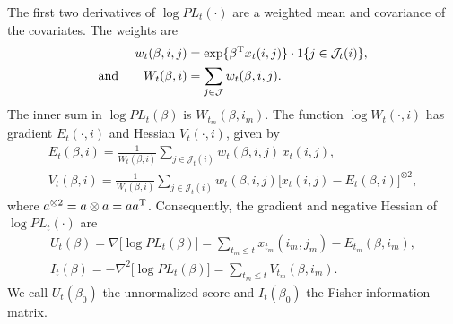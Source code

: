 \documentclass[aoas,preprint]{imsart}
\begin{document}
The first two derivatives of $\log \mathit{PL}_t(\cdot)$ are a weighted
mean and covariance of the covariates.  The weights are
\begin{subequations}
\begin{align}
    w_{t}(\beta, i,j)
        &=
        \exp\{ \beta^\trans x_t(i,j) \}
        \cdot
        1\{ j \in \mathcal{J}_t(i)\}, \\
    \text{and}\qquad
    W_{t}(\beta, i)
        &=
        \sum_{j \in \mathcal{J}} w_{t}(\beta, i,j).
\end{align}
\end{subequations}
The inner sum in $\log \mathit{PL}_t(\beta)$ is
$W_{t_m}\!(\beta, i_m)$.  The function 
$\log W_{t}(\cdot, i)$ has gradient $E_{t}(\cdot, i)$ and Hessian 
$V_{t}(\cdot, i)$, given by
\begin{subequations}
\begin{gather}
    E_{t}(\beta, i)
        =
        \frac{1}{W_{t}(\beta, i)}
        \sum_{j \in \mathcal{J}_t(i)}
            w_{t}(\beta, i,j) \, x_{t}(i,j), \\
    V_{t}(\beta, i)
        =
        \frac{1}{W_{t}(\beta, i)}
        \sum_{j \in \mathcal{J}_t(i)}
            w_{t}(\beta, i,j) 
            \Big[ x_{t}(i,j) - E_{t}(\beta, i)\Big]^{\otimes 2},
\end{gather}
\end{subequations}
where $a^{\otimes 2} = a \otimes a = a a^{\mathrm{T}}$.
Consequently, the gradient and negative Hessian of
$\log \mathit{PL}_t(\cdot)$ are
\begin{subequations}
\begin{gather}
    \label{E:log-pl-gradient}
    U_t(\beta)
        =
        \nabla \big[ \log \mathit{PL}_t(\beta) \big]
        =
        \sum_{t_m \leq t}
            x_{t_m}(i_m, j_m) - E_{t_m}(\beta, i_m), \\
    \label{E:log-pl-neg-hessian}            
    I_t(\beta)
        =
        -\nabla^2 \big[ \log \mathit{PL}_t(\beta) \big]
        =
        \sum_{t_m \leq t}
            V_{t_m}(\beta, i_m).
\end{gather}
\end{subequations}
We call $U_t(\beta_0)$ the unnormalized score and $I_t(\beta_0)$
the Fisher information matrix.
\end{document}
